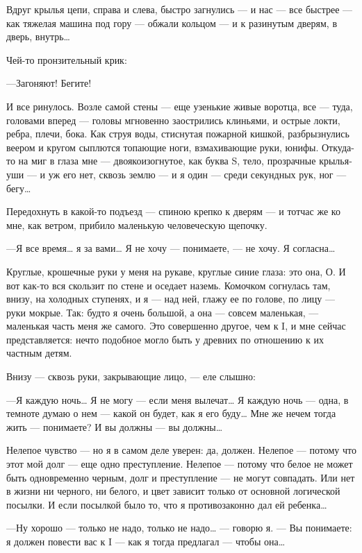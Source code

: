 \documentclass[11pt,openany]{book}
\begin{document}
Вдруг крылья цепи, справа и слева, быстро загнулись --- и нас --- все быстрее --- как тяжелая машина под гору --- обжали кольцом --- и к разинутым дверям, в дверь, внутрь\ldots{}

Чей-то пронзительный крик:

---Загоняют! Бегите!

И все ринулось. Возле самой стены --- еще узенькие живые воротца, все --- туда, головами вперед --- головы мгновенно заострились клиньями, и острые локти, ребра, плечи, бока. Как струя воды, стиснутая пожарной кишкой, разбрызнулись веером и кругом сыплются топающие ноги, взмахивающие руки, юнифы. Откуда-то на миг в глаза мне --- двоякоизогнутое, как буква S, тело, прозрачные крылья-уши --- и уж его нет, сквозь землю --- и я один --- среди секундных рук, ног --- бегу\ldots{}

Передохнуть в какой-то подъезд --- спиною крепко к дверям --- и тотчас же ко мне, как ветром, прибило маленькую человеческую щепочку.

---Я все время\ldots{} я за вами\ldots{} Я не хочу --- понимаете, --- не хочу. Я согласна\ldots{}

Круглые, крошечные руки у меня на рукаве, круглые синие глаза: это она, О. И вот как-то вся скользит по стене и оседает наземь. Комочком согнулась там, внизу, на холодных ступенях, и я --- над ней, глажу ее по голове, по лицу --- руки мокрые. Так: будто я очень большой, а она --- совсем маленькая, --- маленькая часть меня же самого. Это совершенно другое, чем к I, и мне сейчас представляется: нечто подобное могло быть у древних по отношению к их частным детям.

Внизу --- сквозь руки, закрывающие лицо, --- еле слышно:

---Я каждую ночь\ldots{} Я не могу --- если меня вылечат\ldots{} Я каждую ночь --- одна, в темноте думаю о нем --- какой он будет, как я его буду\ldots{} Мне же нечем тогда жить --- понимаете? И вы должны --- вы должны\ldots{}

Нелепое чувство --- но я в самом деле уверен: да, должен. Нелепое --- потому что этот мой долг --- еще одно преступление. Нелепое --- потому что белое не может быть одновременно черным, долг и преступление --- не могут совпадать. Или нет в жизни ни черного, ни белого, и цвет зависит только от основной логической посылки. И если посылкой было то, что я противозаконно дал ей ребенка\ldots{}

---Ну хорошо --- только не надо, только не надо\ldots{} --- говорю я. --- Вы понимаете: я должен повести вас к I --- как я тогда предлагал --- чтобы она\ldots{}
\end{document}
